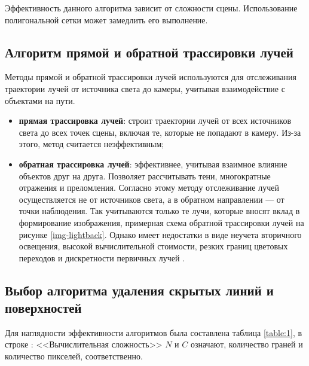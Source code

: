 Эффективность данного алгоритма зависит от сложности сцены. Использование полигональной сетки может замедлить его выполнение.


\subsection{Алгоритм прямой и обратной трассировки лучей}

Методы прямой и обратной трассировки лучей используются для отслеживания траектории лучей от источника света до камеры, учитывая взаимодействие с объектами на пути. 

\begin{itemize}
	\item \textbf{прямая трассировка лучей}: строит траектории лучей от всех источников света до всех точек сцены, включая те, которые не попадают в камеру. Из-за этого, метод считается неэффективным;
	
	\item \textbf{обратная трассировка лучей}: эффективнее, учитывая взаимное влияние объектов друг на друга. Позволяет рассчитывать тени, многократные отражения и преломления. Согласно этому методу отслеживание лучей осуществляется не от источников света, а в обратном направлении --- от точки наблюдения. Так учитываются только те лучи, которые вносят вклад в формирование изображения, примерная схема обратной трассировки лучей на рисунке \ref{img-lightback}. Однако имеет недостатки в виде неучета вторичного освещения, высокой вычислительной стоимости, резких границ цветовых переходов и дискретности первичных лучей \cite{ray_tracing}.
	
\end{itemize}
 
 
\subsection{Выбор алгоритма удаления скрытых линий и поверхностей}


Для наглядности эффективности алгоритмов была составлена таблица \ref{table:1}, в строке : <<Вычислительная сложность>> $N$ и $C$ означают, количество граней и количество пикселей, соответственно.



